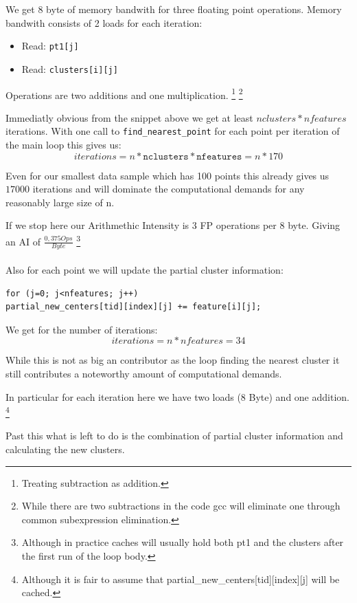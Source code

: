 We get 8 byte of memory bandwith for three floating point operations.
Memory bandwith consists of 2 loads for each iteration:
\begin{itemize}
	\item Read: \texttt{pt1[j]}
	\item Read: \texttt{clusters[i][j]}
\end{itemize}
Operations are two additions and one multiplication.
\footnote{Treating subtraction as addition.}
\footnote{While there are two subtractions in the code gcc will eliminate one through common subexpression elimination.}


Immediatly obvious from the snippet above we get at least $nclusters * nfeatures$ iterations.
With one call to \texttt{find\_nearest\_point} for each point per iteration of the main loop this gives us:\\
$$iterations = n * \texttt{nclusters} * \texttt{nfeatures} = n * 170$$

Even for our smallest data sample which has 100 points this already gives us $17000$ iterations and will dominate the computational demands for any reasonably large size of n.

If we stop here our Arithmethic Intensity is 3 FP operations per 8 byte. Giving an AI of $\frac{0,375 Ops}{Byte}$
\footnote{Although in practice caches will usually hold both pt1 and the clusters after the first run of the loop body.}


\paragraph{}
Also for each point we will update the partial cluster information:
\begin{lstlisting}[caption={Updating (partial) cluster information},label=lblUpdPartClst]
for (j=0; j<nfeatures; j++)
partial_new_centers[tid][index][j] += feature[i][j];
\end{lstlisting}
We get for the number of iterations:
$$iterations = n * nfeatures = 34$$

While this is not as big an contributor as the loop finding the nearest cluster
it still contributes a noteworthy amount of computational demands.

In particular for each iteration here we have two loads (8 Byte) and one addition.
\footnote{Although it is fair to assume that partial\_new\_centers[tid][index][j] will be cached.}

Past this what is left to do is the combination of partial cluster information and calculating the new clusters.


